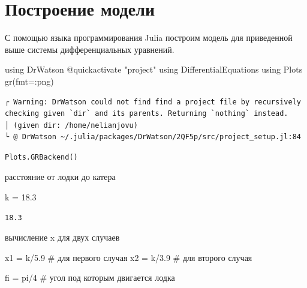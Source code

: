 \documentclass[
  12pt,
  a4paper,
  DIV=11,
  numbers=noendperiod]{scrreprt}
\newenvironment{Shaded}{\begin{snugshade}}{\end{snugshade}}
\newcommand{\BuiltInTok}[1]{\textcolor[rgb]{0.00,0.23,0.31}{#1}}
\newcommand{\CommentTok}[1]{\textcolor[rgb]{0.37,0.37,0.37}{#1}}
\newcommand{\ConstantTok}[1]{\textcolor[rgb]{0.56,0.35,0.01}{#1}}
\newcommand{\FloatTok}[1]{\textcolor[rgb]{0.68,0.00,0.00}{#1}}
\newcommand{\FunctionTok}[1]{\textcolor[rgb]{0.28,0.35,0.67}{#1}}
\newcommand{\ImportTok}[1]{\textcolor[rgb]{0.00,0.46,0.62}{#1}}
\newcommand{\NormalTok}[1]{\textcolor[rgb]{0.00,0.23,0.31}{#1}}
\newcommand{\OperatorTok}[1]{\textcolor[rgb]{0.37,0.37,0.37}{#1}}
\newcommand{\PreprocessorTok}[1]{\textcolor[rgb]{0.68,0.00,0.00}{#1}}
\newcommand{\StringTok}[1]{\textcolor[rgb]{0.13,0.47,0.30}{#1}}
\begin{document}
\section{Построение
модели}\label{ux43fux43eux441ux442ux440ux43eux435ux43dux438ux435-ux43cux43eux434ux435ux43bux438}

С помощью языка программирования Julia построим модель для приведенной
выше системы дифференциальных уравнений.

\begin{Shaded}
\begin{Highlighting}[]
\ImportTok{using} \BuiltInTok{DrWatson}
\PreprocessorTok{@quickactivate} \StringTok{"project"}
\ImportTok{using} \BuiltInTok{DifferentialEquations}
\ImportTok{using} \BuiltInTok{Plots}
\FunctionTok{gr}\NormalTok{(fmt}\OperatorTok{=:}\NormalTok{png)}
\end{Highlighting}
\end{Shaded}

\begin{verbatim}
┌ Warning: DrWatson could not find find a project file by recursively checking given `dir` and its parents. Returning `nothing` instead.
│ (given dir: /home/nelianjovu)
└ @ DrWatson ~/.julia/packages/DrWatson/2QF5p/src/project_setup.jl:84
\end{verbatim}

\begin{verbatim}
Plots.GRBackend()
\end{verbatim}

расстояние от лодки до катера

\begin{Shaded}
\begin{Highlighting}[]
\NormalTok{k }\OperatorTok{=} \FloatTok{18.3}
\end{Highlighting}
\end{Shaded}

\begin{verbatim}
18.3
\end{verbatim}

вычисление x для двух случаев

\begin{Shaded}
\begin{Highlighting}[]
\NormalTok{x1 }\OperatorTok{=}\NormalTok{ k}\OperatorTok{/}\FloatTok{5.9}   \CommentTok{\# для первого случая}
\NormalTok{x2 }\OperatorTok{=}\NormalTok{ k}\OperatorTok{/}\FloatTok{3.9}   \CommentTok{\# для второго случая}

\NormalTok{fi }\OperatorTok{=} \ConstantTok{pi}\OperatorTok{/}\FloatTok{4}  \CommentTok{\# угол под которым двигается лодка}
\end{Highlighting}
\end{Shaded}
\end{document}
